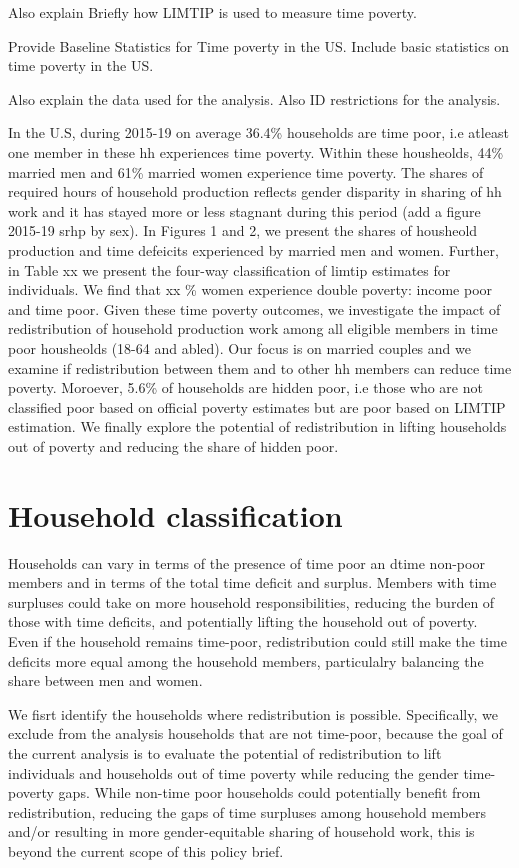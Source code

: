 \documentclass[
  11pt,
]{article}
\begin{document}
Also explain Briefly how LIMTIP is used to measure time poverty.

Provide Baseline Statistics for Time poverty in the US. Include basic
statistics on time poverty in the US.

Also explain the data used for the analysis. Also ID restrictions for
the analysis.

In the U.S, during 2015-19 on average 36.4\% households are time poor,
i.e atleast one member in these hh experiences time poverty. Within
these housheolds, 44\% married men and 61\% married women experience
time poverty. The shares of required hours of household production
reflects gender disparity in sharing of hh work and it has stayed more
or less stagnant during this period (add a figure 2015-19 srhp by sex).
In Figures 1 and 2, we present the shares of housheold production and
time defeicits experienced by married men and women. Further, in Table
xx we present the four-way classification of limtip estimates for
individuals. We find that xx \% women experience double poverty: income
poor and time poor. Given these time poverty outcomes, we investigate
the impact of redistribution of household production work among all
eligible members in time poor housheolds (18-64 and abled). Our focus is
on married couples and we examine if redistribution between them and to
other hh members can reduce time poverty. Moroever, 5.6\% of households
are hidden poor, i.e those who are not classified poor based on official
poverty estimates but are poor based on LIMTIP estimation. We finally
explore the potential of redistribution in lifting households out of
poverty and reducing the share of hidden poor.

\section{Household classification}\label{household-classification}

Households can vary in terms of the presence of time poor an dtime
non-poor members and in terms of the total time deficit and surplus.
Members with time surpluses could take on more household
responsibilities, reducing the burden of those with time deficits, and
potentially lifting the household out of poverty. Even if the household
remains time-poor, redistribution could still make the time deficits
more equal among the household members, particulalry balancing the share
between men and women.

We fisrt identify the households where redistribution is possible.
Specifically, we exclude from the analysis households that are not
time-poor, because the goal of the current analysis is to evaluate the
potential of redistribution to lift individuals and households out of
time poverty while reducing the gender time-poverty gaps. While non-time
poor households could potentially benefit from redistribution, reducing
the gaps of time surpluses among household members and/or resulting in
more gender-equitable sharing of household work, this is beyond the
current scope of this policy brief.
\end{document}
